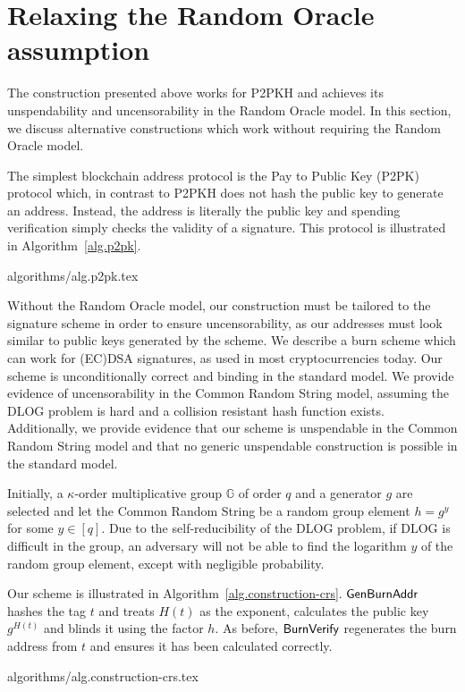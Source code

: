 \section{Relaxing the Random Oracle assumption}\label{sec:standard}

The construction presented above works for P2PKH and achieves its unspendability and uncensorability in the Random Oracle model. In this section, we discuss alternative constructions which work without requiring the Random Oracle model.

The simplest blockchain address protocol is the Pay to Public Key (P2PK) protocol which, in contrast to P2PKH does not hash the public key to generate an address. Instead, the address is literally the public key and spending verification simply checks the validity of a signature. This protocol is illustrated in Algorithm~\ref{alg.p2pk}.

{algorithms/alg.p2pk.tex}

Without the Random Oracle model, our construction must be tailored to the signature scheme in order to ensure uncensorability, as our addresses must look similar to public keys generated by the scheme. We describe a burn scheme which can work for (EC)DSA signatures, as used in most cryptocurrencies today. Our scheme is unconditionally correct and binding in the standard model. We provide evidence of uncensorability in the Common Random String model, assuming the DLOG problem is hard and a collision resistant hash function exists. Additionally, we provide evidence that our scheme is unspendable in the Common Random String model and that no generic unspendable construction is possible in the standard model.

Initially, a $\kappa$-order multiplicative group $\mathbb{G}$ of order $q$ and a generator $g$ are selected and let the Common Random String be a random group element $h = g^y$ for some $y \in [q]$. Due to the self-reducibility of the DLOG problem, if DLOG is difficult in the group, an adversary will not be able to find the logarithm $y$ of the random group element, except with negligible probability.

Our scheme is illustrated in Algorithm~\ref{alg.construction-crs}. $\mathsf{Gen}\-\mathsf{Burn}\-\mathsf{Addr}$ hashes the tag $t$ and treats $H(t)$ as the exponent, calculates the public key $g^{H(t)}$ and blinds it using the factor $h$. As before, $\mathsf{BurnVerify}$ regenerates the burn address from $t$ and ensures it has been calculated correctly.

{algorithms/alg.construction-crs.tex}

